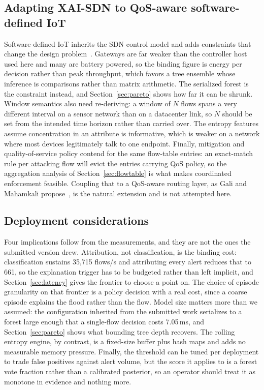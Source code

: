 \documentclass{ieeeaccess}
\begin{document}
\subsection{Adapting XAI-SDN to QoS-aware software-defined IoT}
\label{sec:sdiot}
Software-defined IoT inherits the SDN control model and adds constraints that
change the design problem~\cite{bhayo2023sdiot,gali2025qos}. Gateways are far
weaker than the controller host used here and many are battery powered, so the
binding figure is energy per decision rather than peak throughput, which favors
a tree ensemble whose inference is comparisons rather than matrix arithmetic. The
serialized forest is the constraint instead, and Section~\ref{sec:pareto} shows
how far it can be shrunk. Window semantics also need re-deriving: a window of $N$
flows spans a very different interval on a sensor network than on a datacenter
link, so $N$ should be set from the intended time horizon rather than carried
over. The entropy features assume concentration in an attribute is informative,
which is weaker on a network where most devices legitimately talk to one
endpoint. Finally, mitigation and quality-of-service policy contend for the same
flow-table entries: an exact-match rule per attacking flow will evict the entries
carrying QoS policy, so the aggregation analysis of Section~\ref{sec:flowtable}
is what makes coordinated enforcement feasible. Coupling that to a QoS-aware
routing layer, as Gali and Mahamkali propose~\cite{gali2025qos}, is the natural
extension and is not attempted here.

\subsection{Deployment considerations}
Four implications follow from the measurements, and they are not the ones the
submitted version drew. Attribution, not classification, is the binding cost:
classification sustains 35,715 flows/s and attributing every alert reduces that to
661, so the explanation trigger has to be budgeted rather than left implicit, and
Section~\ref{sec:latency} gives the frontier to choose a point on. The choice of
episode granularity on that frontier is a policy decision with a real cost, since
a coarse episode explains the flood rather than the flow. Model size matters more
than we assumed: the configuration inherited from the submitted work serializes to
a forest large enough that a single-flow decision costs 7.05\,ms, and
Section~\ref{sec:pareto} shows what bounding tree depth recovers. The rolling
entropy engine, by contrast, is a fixed-size buffer plus hash maps and adds no
measurable memory pressure. Finally, the threshold can be tuned per deployment to
trade false positives against alert volume, but the score it applies to is a
forest vote fraction rather than a calibrated posterior, so an operator should
treat it as monotone in evidence and nothing more.
\end{document}
